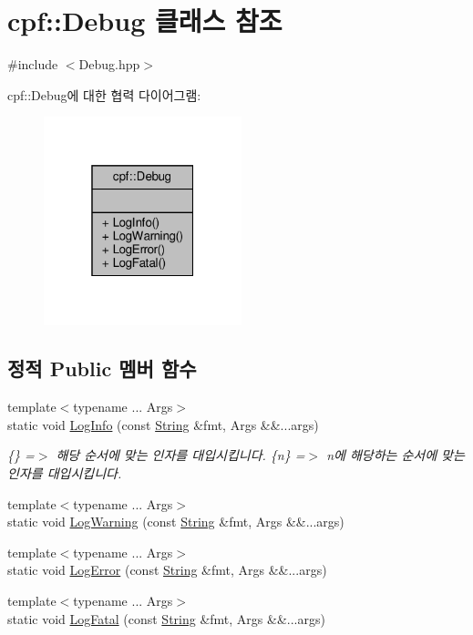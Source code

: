 \hypertarget{classcpf_1_1_debug}{}\section{cpf\+:\+:Debug 클래스 참조}
\label{classcpf_1_1_debug}


{\ttfamily \#include $<$Debug.\+hpp$>$}



cpf\+:\+:Debug에 대한 협력 다이어그램\+:\nopagebreak
\begin{figure}[H]
\begin{center}
\leavevmode
\includegraphics[width=163pt]{classcpf_1_1_debug__coll__graph}
\end{center}
\end{figure}
\subsection*{정적 Public 멤버 함수}
\begin{DoxyCompactItemize}
\item 
{\footnotesize template$<$typename ... Args$>$ }\\static void \hyperlink{classcpf_1_1_debug_a4fdb5fd97498bef70585fcac8047efa2}{Log\+Info} (const \hyperlink{namespacecpf_a4dbd6992c3ed4440ce7ed8982ff7ffea}{String} \&fmt, Args \&\&...args)
\begin{DoxyCompactList}\small\item\em \{\} =$>$ 해당 순서에 맞는 인자를 대입시킵니다. \{n\} =$>$ n에 해당하는 순서에 맞는 인자를 대입시킵니다. \end{DoxyCompactList}\item 
{\footnotesize template$<$typename ... Args$>$ }\\static void \hyperlink{classcpf_1_1_debug_a57373c6a7f52d7d41282596e2eb7d901}{Log\+Warning} (const \hyperlink{namespacecpf_a4dbd6992c3ed4440ce7ed8982ff7ffea}{String} \&fmt, Args \&\&...args)
\item 
{\footnotesize template$<$typename ... Args$>$ }\\static void \hyperlink{classcpf_1_1_debug_a3c867b9c24006a8b45b661b35efea6d2}{Log\+Error} (const \hyperlink{namespacecpf_a4dbd6992c3ed4440ce7ed8982ff7ffea}{String} \&fmt, Args \&\&...args)
\item 
{\footnotesize template$<$typename ... Args$>$ }\\static void \hyperlink{classcpf_1_1_debug_a22849847c74bcb444922c263c9ae6183}{Log\+Fatal} (const \hyperlink{namespacecpf_a4dbd6992c3ed4440ce7ed8982ff7ffea}{String} \&fmt, Args \&\&...args)
\end{DoxyCompactItemize}


